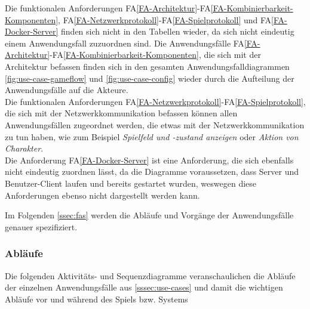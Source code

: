 \documentclass{uulm-assignment}
\newcounter{fa}
\newcounter{nfa}
\newcommand{\mfaref}[1]{FA\ref{#1}}
\begin{document}
\vspace{0.5cm}

Die funktionalen Anforderungen \mfaref{FA-Architektur}-\mfaref{FA-Kombinierbarkeit-Komponenten}, \mfaref{FA-Netzwerkprotokoll}-\mfaref{FA-Spielprotokoll} und \mfaref{FA-Docker-Server} finden sich nicht in den Tabellen wieder, da sich nicht eindeutig einem Anwendungsfall zuzuordnen sind. Die Anwendungsfälle \mfaref{FA-Architektur}-\mfaref{FA-Kombinierbarkeit-Komponenten}, die sich mit der Architektur befassen finden sich in den gesamten Anwendungsfalldiagrammen \autoref{fig:use-case-gameflow} und \autoref{fig:use-case-config} wieder durch die Aufteilung der Anwendungsfälle auf die Akteure. \\ Die funktionalen Anforderungen \mfaref{FA-Netzwerkprotokoll}-\mfaref{FA-Spielprotokoll}, die sich mit der Netzwerkkommunikation befassen können allen Anwendungsfällen zugeordnet werden, die etwas mit der Netzwerkkommunikation zu tun haben, wie zum Beispiel \textit{Spielfeld und -zustand anzeigen} oder \textit{Aktion von Charakter}. \\ Die Anforderung \mfaref{FA-Docker-Server} ist eine Anforderung, die sich ebenfalls nicht eindeutig zuordnen lässt, da die Diagramme voraussetzen, dass Server und Benutzer-Client laufen und bereits gestartet wurden, weswegen diese Anforderungen ebenso nicht dargestellt werden kann. \par \par 
Im Folgenden \autoref{ssec:fas} werden die Abläufe und Vorgänge der Anwendungsfälle genauer spezifiziert. 

\subsubsection{Abläufe}
\label{ssec:processes}

Die folgenden Aktivitäts- und Sequenzdiagramme veranschaulichen die Abläufe der einzelnen Anwendungsfälle aus \autoref{sssec:use-cases} und damit die wichtigen Abläufe vor und während des Spiels bzw. Systems

\end{document}
